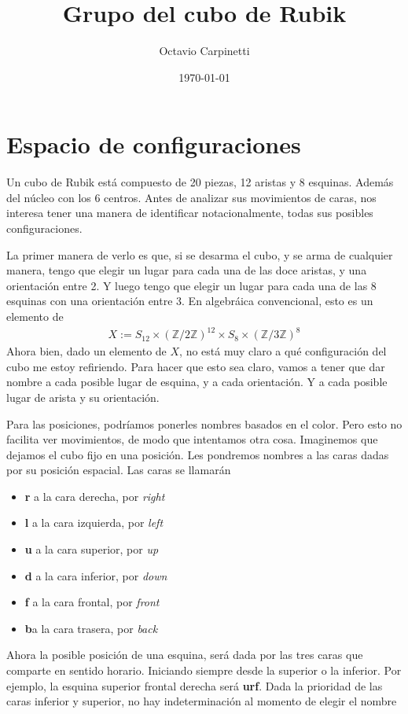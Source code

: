 \documentclass{article}
\title{Grupo del cubo de Rubik}
\author{Octavio Carpinetti}
\date{\today}
\theoremstyle{definition}
\newcommand{\Z}{\mathbb{Z}}
\renewcommand{\r}{\textbf{r}}
\renewcommand{\l}{\textbf{l}}
\renewcommand{\u}{\textbf{u}}
\renewcommand{\b}{\textbf{b}}
\newcommand{\f}{\textbf{f}}
\renewcommand{\d}{\textbf{d}}
\begin{document}
\maketitle

\section{Espacio de configuraciones}
Un cubo de Rubik está compuesto de 20 piezas, 12 aristas y 8 esquinas. Además del núcleo con los 6 centros. Antes de analizar sus movimientos de caras, nos interesa tener una manera de identificar notacionalmente, todas sus posibles configuraciones.

La primer manera de verlo es que, si se desarma el cubo, y se arma de cualquier manera, tengo que elegir un lugar para cada una de las doce aristas, y una orientación entre 2. Y luego tengo que elegir un lugar para cada una de las 8 esquinas con una orientación entre 3. En algebráica convencional, esto es un elemento de
\begin{align*}
    X:=S_{12}\times (\Z/2\Z)^{12}\times S_{8}\times (\Z/3\Z)^{8}
\end{align*}
Ahora bien, dado un elemento de $X$, no está muy claro a qué configuración del cubo me estoy refiriendo. Para hacer que esto sea claro, vamos a tener que dar nombre a cada posible lugar de esquina, y a cada orientación. Y a cada posible lugar de arista y su orientación.

Para las posiciones, podríamos ponerles nombres basados en el color. Pero esto no facilita ver movimientos, de modo que intentamos otra cosa. Imaginemos que dejamos el cubo fijo en una posición. Les pondremos nombres a las caras dadas por su posición espacial. Las caras se llamarán
\begin{itemize}
    \item \r{} a la cara derecha, por \textit{right}
    \item \l{} a la cara izquierda, por \textit{left}
    \item \u{} a la cara superior, por \textit{up}
    \item \d{} a la cara inferior, por \textit{down}
    \item \f{} a la cara frontal, por \textit{front}
    \item \b {}a la cara trasera, por \textit{back}
\end{itemize}
Ahora la posible posición de una esquina, será dada por las tres caras que comparte en sentido horario. Iniciando siempre desde la superior o la inferior. Por ejemplo, la esquina superior frontal derecha será \u\r\f. Dada la prioridad de las caras inferior y superior, no hay indeterminación al momento de elegir el nombre
\end{document}
